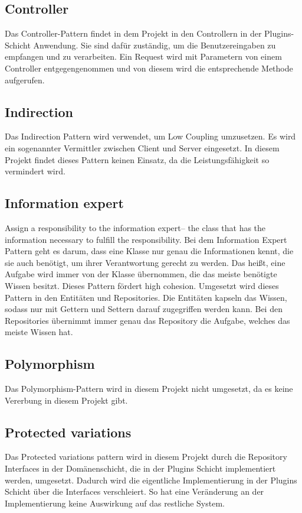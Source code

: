     \subsection{Controller}
    Das Controller-Pattern findet in dem Projekt in den Controllern in der Plugins-Schicht Anwendung. Sie sind dafür zuständig, um die Benutzereingaben zu empfangen und zu verarbeiten. Ein Request wird mit Parametern von einem Controller entgegengenommen und von diesem wird die entsprechende Methode aufgerufen.
    
    \subsection{Indirection}
    Das Indirection Pattern wird verwendet, um Low Coupling umzusetzen. Es wird ein sogenannter Vermittler zwischen Client und Server eingesetzt. In diesem Projekt findet dieses Pattern keinen Einsatz, da die Leistungsfähigkeit so vermindert wird.
    
    \subsection{Information expert}
    Assign a responsibility to the information expert– the class that has the information necessary to fulfill the responsibility.
    Bei dem Information Expert Pattern geht es darum, dass eine Klasse nur genau die Informationen kennt, die sie auch benötigt, um ihrer Verantwortung gerecht zu werden. Das heißt, eine Aufgabe wird immer von der Klasse übernommen, die das meiste benötigte Wissen besitzt. Dieses Pattern fördert high cohesion. Umgesetzt wird dieses Pattern in den Entitäten und Repositories. Die Entitäten kapseln das Wissen, sodass nur mit Gettern und Settern darauf zugegriffen werden kann. Bei den Repositories übernimmt immer genau das Repository die Aufgabe, welches das meiste Wissen hat.
    
    \subsection{Polymorphism}
    Das Polymorphism-Pattern wird in diesem Projekt nicht umgesetzt, da es keine Vererbung in diesem Projekt gibt.
    
    \subsection{Protected variations}
    Das Protected variations pattern wird in diesem Projekt durch die Repository Interfaces in der Domänenschicht, die in der Plugins Schicht implementiert werden, umgesetzt. Dadurch wird die eigentliche Implementierung in der Plugins Schicht über die Interfaces verschleiert. So hat eine Veränderung an der Implementierung keine Auswirkung auf das restliche System.
    
